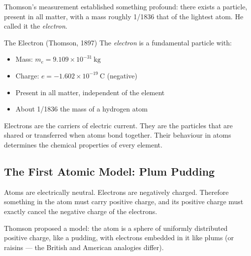\documentclass[12pt, a4paper]{book}
\theoremstyle{definition}
\newcommand{\newterm}[1]{\textit{\textcolor{DiscoveryColor}{#1}}}
\begin{document}
\vspace{0.5em}

Thomson's measurement established something profound:
there exists a particle, present in all matter,
with a mass roughly 1/1836 that of the lightest atom.
He called it the \newterm{electron}.

\begin{namedconcept}{The Electron (Thomson, 1897)}
The \newterm{electron} is a fundamental particle with:
\begin{itemize}[nosep, leftmargin=2em]
  \item Mass: $m_e = 9.109 \times 10^{-31}\ \si{\kilogram}$
  \item Charge: $e = -1.602 \times 10^{-19}\ \si{\coulomb}$ (negative)
  \item Present in all matter, independent of the element
  \item About 1/1836 the mass of a hydrogen atom
\end{itemize}
Electrons are the carriers of electric current.
They are the particles that are shared or transferred
when atoms bond together.
Their behaviour in atoms determines the
chemical properties of every element.
\end{namedconcept}

\subsection{The First Atomic Model: Plum Pudding}

Atoms are electrically neutral.
Electrons are negatively charged.
Therefore something in the atom must carry positive charge,
and its positive charge must exactly cancel the negative
charge of the electrons.

Thomson proposed a model:
the atom is a sphere of uniformly distributed positive charge,
like a pudding, with electrons embedded in it like plums
(or raisins --- the British and American analogies differ).
\end{document}
